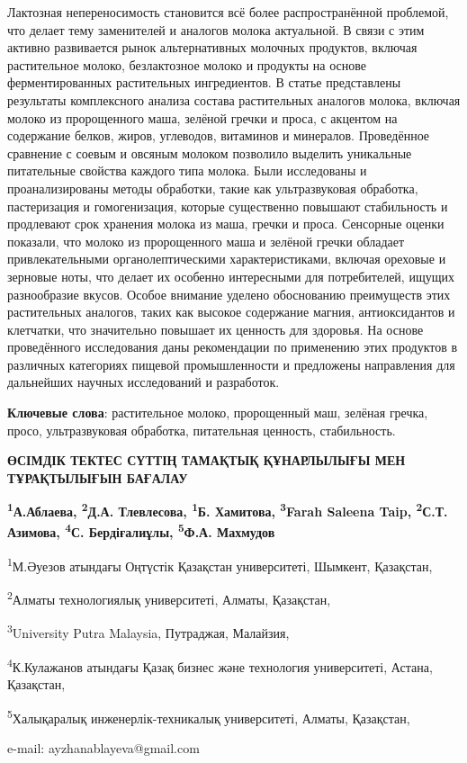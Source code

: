 Лактозная непереносимость становится всё более распространённой
проблемой, что делает тему заменителей и аналогов молока актуальной. В
связи с этим активно развивается рынок альтернативных молочных
продуктов, включая растительное молоко, безлактозное молоко и продукты
на основе ферментированных растительных ингредиентов. В статье
представлены результаты комплексного анализа состава растительных
аналогов молока, включая молоко из пророщенного маша, зелёной гречки и
проса, с акцентом на содержание белков, жиров, углеводов, витаминов и
минералов. Проведённое сравнение с соевым и овсяным молоком позволило
выделить уникальные питательные свойства каждого типа молока. Были
исследованы и проанализированы методы обработки, такие как
ультразвуковая обработка, пастеризация и гомогенизация, которые
существенно повышают стабильность и продлевают срок хранения молока из
маша, гречки и проса. Сенсорные оценки показали, что молоко из
пророщенного маша и зелёной гречки обладает привлекательными
органолептическими характеристиками, включая ореховые и зерновые ноты,
что делает их особенно интересными для потребителей, ищущих разнообразие
вкусов. Особое внимание уделено обоснованию преимуществ этих
растительных аналогов, таких как высокое содержание магния,
антиоксидантов и клетчатки, что значительно повышает их ценность для
здоровья. На основе проведённого исследования даны рекомендации по
применению этих продуктов в различных категориях пищевой промышленности
и предложены направления для дальнейших научных исследований и
разработок.

{\bfseries Ключевые слова}: растительное молоко, пророщенный маш, зелёная
гречка, просо, ультразвуковая обработка, питательная ценность,
стабильность.

\begin{articleheader}
{\bfseries ӨСІМДІК ТЕКТЕС СҮТТІҢ ТАМАҚТЫҚ ҚҰНАРЛЫЛЫҒЫ МЕН ТҰРАҚТЫЛЫҒЫН БАҒАЛАУ}

{\bfseries
\textsuperscript{1}А.Аблаева\textsuperscript{\envelope },
\textsuperscript{2}Д.А. Тлевлесова,
\textsuperscript{1}Б. Хамитова,
\textsuperscript{3}Farah Saleena Taip,
\textsuperscript{2}С.Т. Азимова,
\textsuperscript{4}С. Бердіғалиұлы,
\textsuperscript{5}Ф.А. Махмудов
}
\end{articleheader}

\begin{affiliation}
\textsuperscript{1}М.Әуезов атындағы Оңтүстік Қазақстан университеті, Шымкент, Қазақстан,

\textsuperscript{2}Алматы технологиялық университеті, Алматы, Қазақстан,

\textsuperscript{3}University Putra Malaysia, Путраджая, Малайзия,

\textsuperscript{4}К.Кулажанов атындағы Қазақ бизнес және технология университеті, Астана, Қазақстан,

\textsuperscript{5}Халықаралық инженерлік-техникалық университеті, Алматы, Қазақстан,

e-mail: ayzhanablayeva@gmail.com
\end{affiliation}

